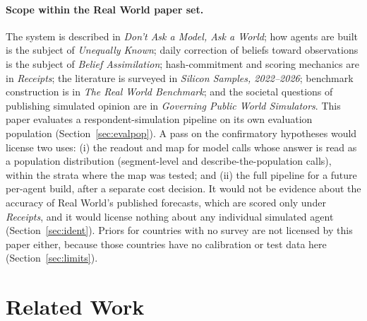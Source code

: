\documentclass[11pt]{article}
\begin{document}
\paragraph{Scope within the Real World paper set.}
\label{sec:scope}
The system is described in \emph{Don't Ask a Model, Ask a World}; how agents are built is the subject of \emph{Unequally Known}; daily correction of beliefs toward observations is the subject of \emph{Belief Assimilation}; hash-commitment and scoring mechanics are in \emph{Receipts}; the literature is surveyed in \emph{Silicon Samples, 2022--2026}; benchmark construction is in \emph{The Real World Benchmark}; and the societal questions of publishing simulated opinion are in \emph{Governing Public World Simulators}. This paper evaluates a respondent-simulation pipeline on its own evaluation population (Section~\ref{sec:evalpop}). A pass on the confirmatory hypotheses would license two uses: (i) the readout and map for model calls whose answer is read as a population distribution (segment-level and describe-the-population calls), within the strata where the map was tested; and (ii) the full pipeline for a future per-agent build, after a separate cost decision. It would not be evidence about the accuracy of Real World's published forecasts, which are scored only under \emph{Receipts}, and it would license nothing about any individual simulated agent (Section~\ref{sec:ident}). Priors for countries with no survey are not licensed by this paper either, because those countries have no calibration or test data here (Section~\ref{sec:limits}).

\section{Related Work}
\end{document}
